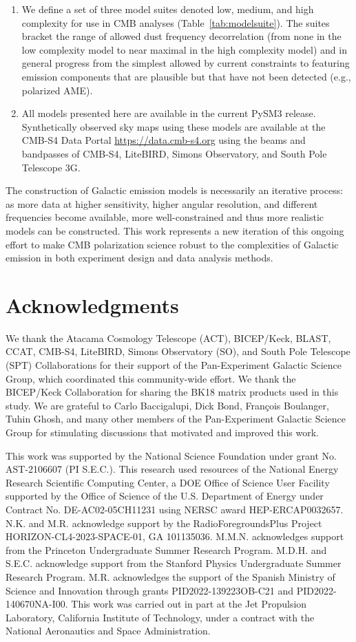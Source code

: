 \documentclass[twocolumn]{aastex631}
\begin{document}
\begin{enumerate}
    \item We define a set of three model suites denoted low, medium, and high complexity for use in CMB analyses (Table~\ref{tab:modelsuite}). The suites bracket the range of allowed dust frequency decorrelation (from none in the low complexity model to near maximal in the high complexity model) and in general progress from the simplest allowed by current constraints to featuring emission components that are plausible but that have not been detected (e.g., polarized AME). 
    \item All models presented here are available in the current PySM3 release. Synthetically observed sky maps using these models are available at the CMB-S4 Data Portal \url{https://data.cmb-s4.org} using the beams and bandpasses of CMB-S4, LiteBIRD, Simons Observatory, and South Pole Telescope 3G.
\end{enumerate}

The construction of Galactic emission models is necessarily an iterative process: as more data at higher sensitivity, higher angular resolution, and different frequencies become available, more well-constrained and thus more realistic models can be constructed. This work represents a new iteration of this ongoing effort to make CMB polarization science robust to the complexities of Galactic emission in both experiment design and data analysis methods. 

\section*{Acknowledgments}
We thank the Atacama Cosmology Telescope (ACT), BICEP/Keck, BLAST, CCAT, CMB-S4, LiteBIRD, Simons Observatory (SO), and South Pole Telescope (SPT) Collaborations for their support of the Pan-Experiment Galactic Science Group, which coordinated this community-wide effort. We thank the BICEP/Keck Collaboration for sharing the BK18 matrix products used in this study. We are grateful to Carlo Baccigalupi, Dick Bond, Fran\c{c}ois Boulanger, Tuhin Ghosh, and many other members of the Pan-Experiment Galactic Science Group for stimulating discussions that motivated and improved this work. 

This work was supported by the National Science Foundation under grant No. AST-2106607 (PI S.E.C.). This research used resources of the National Energy Research Scientific Computing Center, a DOE Office of Science User Facility supported by the Office of Science of the U.S. Department of Energy under Contract No. DE-AC02-05CH11231 using NERSC award HEP-ERCAP0032657. N.K. and M.R. acknowledge support by the RadioForegroundsPlus Project HORIZON-CL4-2023-SPACE-01, GA 101135036. M.M.N. acknowledges support from the Princeton Undergraduate Summer Research Program. M.D.H. and S.E.C. acknowledge support from the Stanford Physics Undergraduate Summer Research Program. M.R. acknowledges the support of the Spanish Ministry of Science and Innovation through grants PID2022-139223OB-C21 and PID2022-140670NA-I00. This work was carried out in part at the Jet Propulsion Laboratory, California Institute of Technology, under a contract with the National Aeronautics and Space Administration.
\end{document}
